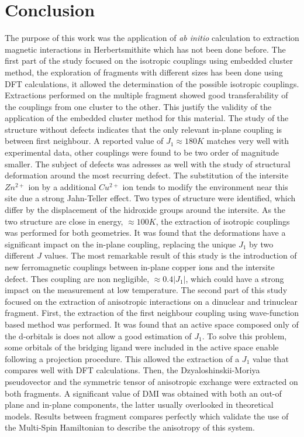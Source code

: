 \documentclass[12pt]{report}
\numberwithin{equation}{section}
\begin{document}
\section{Conclusion}

The purpose of this work was the application of \textit{ab initio} calculation to extraction magnetic interactions in Herbertsmithite which has not been done before.
The first part of the study focused on the isotropic couplings using embedded cluster method, the exploration of fragments with different sizes has been done using DFT calculations, it allowed the determination of the possible isotropic couplings.
Extractions performed on the multiple fragment showed good transferability of the couplings from one cluster to the other.
This justify the validity of the application of the embedded cluster method for this material.
The study of the structure without defects indicates that the only relevant in-plane coupling is between first neighbour.
A reported value of $J_1\approx180 K$ matches very well with experimental data, other couplings were found to be two order of magnitude smaller.
The subject of defects was adresses as well with the study of structural deformation around the most recurring defect. 
The substitution of the intersite $Zn^{2+}$ ion by a additional $Cu^{2+}$ ion tends to modify the environment near this site due a strong Jahn-Teller effect.
Two types of structure were identified, which differ by the displacement of the hidroxide groups around the intersite. 
As the two structure are close in energy, $\approx 100 K$, the extraction of isotropic couplings was performed for both geometries.
It was found that the deformations have a significant impact on the in-plane coupling, replacing the unique $J_1$ by two different $J$ values.
The most remarkable result of this study is the introduction of new ferromagnetic couplings between in-plane copper ions and the intersite defect.
Thes coupling are non negligible, $\approx 0.4 |J_1|$, which could have a strong impact on the measurement at low temperature.
The second part of this study focused on the extraction of anisotropic interactions on a dinuclear and trinuclear fragment.
First, the extraction of the first neighbour coupling using wave-function based method was performed. 
It was found that an active space composed only of the d-orbitals is does not allow a good estimation of $J_1$.
To solve this problem, some orbitals of the bridging ligand were included in the active space enable following a projection procedure.
This allowed the extraction of a $J_1$ value that compares well with DFT calculations.
Then, the Dzyaloshinskii-Moriya pseudovector and the symmetric tensor of anisotropic exchange were extracted on both fragments.
A significant value of DMI was obtained with both an out-of plane and in-plane components, the latter usually overlooked in theoretical models. 
Results between fragment compares perfectly which validate the use of the Multi-Spin Hamiltonian to describe the anisotropy of this system.
\end{document}
